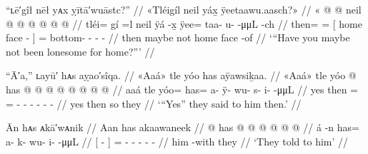 \ex\label{ex:92-150-maybe-lonesome-for-home}%
%
\begingl
	\glpreamble	“ʟē′gîł nēł yᴀx ỵītā′wuāstc?” //
	\glpreamble	«\!Tléigíl neil yáx̱ ÿeetaawu.aasch?\!» //
	\gla	«\! @ {} @ {}
		{} neil  @ {} {}
		 @ {} @ {} @ {} @ {} @ {}  //
	\glb	\pqp{}tléi= gí =l
		{} neil ÿá -x̱ {}
		ÿee= taa- u-  -μμL -ch //
	\glc	\pqp{}then=  =
		{}[ home face - {}]
		= bottom- -  - - //
	\gld	\pqp{}then maybe \•not
		{} home face -of {}
		 {} {} {} {} {} //
	\glft	‘“Have you maybe not been lonesome for home?”’
		//
\endgl
\xe




\ex\label{ex:92-151-said-yes}%
%
\begingl
	\glpreamble	“Ā′a,” ʟayū′ hᴀs aỵao′sîqa. //
	\glpreamble	«\!Aaá\!» tle yóo has aÿawsiḵaa. //
	\gla	«\!Aaá\!» tle yóo @ has @  @ {} @ {} @ {} @ {} @ {} @ {} @ {} //
	\glb	\pqp{}aaá tle yóo= has= a- ÿ- wu- s- i-  -μμL //
	\glc	\pqp{}yes then = = - - - -
			-  - //
	\gld	\pqp{}yes then so they  {} {} {} {} {} {} {} //
	\glft	‘“Yes” they said to him then.’
		//
\endgl
\xe

\ex\label{ex:92-152-told-to-him}%
%
\begingl
	\glpreamble	Ān hᴀs ᴀkā′wᴀnik //
	\glpreamble	Aan has akaawaneek //
	\gla	{}  @ {} {} has @  @ {} @ {} @ {} @ {} @ {} //
	\glb	{} á -n {} has= a- k- wu- i-  -μμL //
	\glc	{}[  - {}]
		= - - - -  - //
	\gld	{} him -with {} they  {} {} {} {} {} //
	\glft	‘They told to him’
		//
\endgl
\xe

